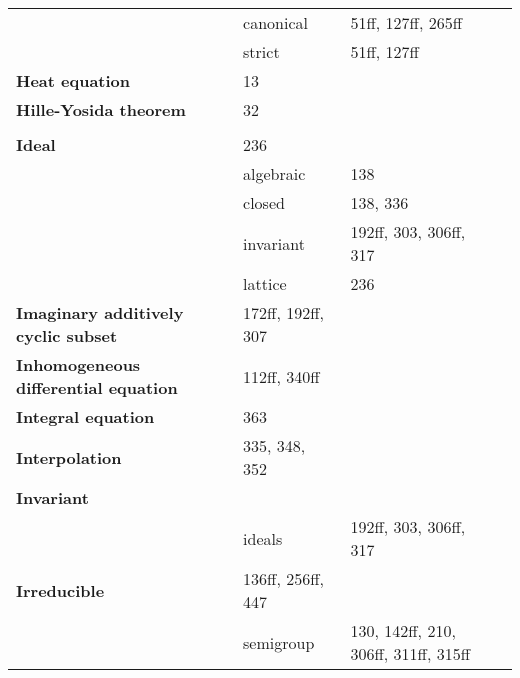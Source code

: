 \documentclass[10pt]{scrartcl}
\begin{document}
\begin{longtable}{>{\bfseries}p{4cm}p{4cm}p{4cm}p{4cm}}
	& canonical 	& 51ff, 127ff, 265ff \\
	& strict 	& 51ff, 127ff \\
Heat equation 	& 13 \\
Hille-Yosida theorem 	& 32 \\
	& \\
Ideal 	& 236 \\
	& algebraic 	& 138 \\
	& closed 	& 138, 336 \\
	& invariant 	& 192ff, 303, 306ff, 317 \\
	& lattice 	& 236 \\
Imaginary additively cyclic subset 	& 172ff, 192ff, 307 \\
Inhomogeneous differential equation 	& 112ff, 340ff \\
Integral equation 	& 363 \\
Interpolation 	& 335, 348, 352 \\
Invariant 	& \\
	& ideals 	& 192ff, 303, 306ff, 317 \\
Irreducible 	& 136ff, 256ff, 447 \\
	& semigroup 	& 130, 142ff, 210, 306ff, 311ff, 315ff \\

\end{longtable}
\end{document}
